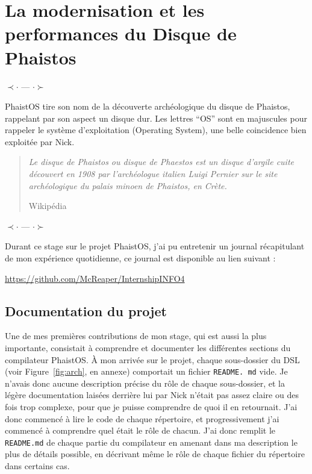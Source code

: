 \section{La modernisation et les performances du Disque de Phaistos}
\label{contrib}

\begin{center}
    $\prec \cdot$ --- $\cdot \succ$ 
\end{center}

PhaistOS tire son nom de la découverte archéologique du disque de Phaistos, 
rappelant par son aspect un disque dur. Les lettres ``OS'' sont en majuscules 
pour rappeler le système d'exploitation (Operating System), une belle 
coincidence bien exploitée par Nick. 

\blockquote[Wikipédia][--]{\textit{Le disque de Phaistos ou disque de Phaestos 
est un disque d'argile cuite découvert en 1908 par l'archéologue italien Luigi 
Pernier sur le site archéologique du palais minoen de Phaistos, en Crète.}
}

\begin{center}
    $\prec \cdot$ --- $\cdot \succ$ 
\end{center}

Durant ce stage sur le projet PhaistOS, j'ai pu entretenir un journal 
récapitulant de mon expérience quotidienne, ce journal est disponible au lien 
suivant :

\begin{center}
\href{https://github.com/McReaper/InternshipINFO4}{https://github.com/McReaper/InternshipINFO4}
\end{center}

\subsection{Documentation du projet}

Une de mes premières contributions de mon stage, qui est aussi la plus 
importante, consistait à comprendre et documenter les différentes sections du 
compilateur PhaistOS. À mon arrivée sur le projet, chaque sous-dossier du DSL 
(voir Figure~\ref{fig:arch}, en annexe) comportait un fichier \texttt{README.
md} vide. Je n'avais donc aucune description précise du rôle de chaque 
sous-dossier, et la légère documentation laisées derrière lui par Nick n'était 
pas assez claire ou des fois trop complexe, pour que je puisse comprendre de 
quoi il en retournait. J'ai donc commencé à lire le code de chaque répertoire, 
et progressivement j'ai commencé à comprendre quel était le rôle de chacun. 
J'ai donc remplit le \texttt{README.md} de chaque partie du compilateur en 
amenant dans ma description le plus de détails possible, en décrivant même le 
rôle de chaque fichier du répertoire dans certains cas. 

